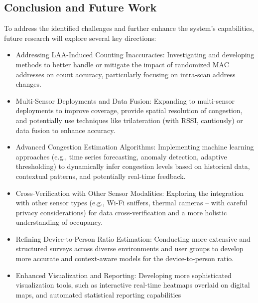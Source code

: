 \documentclass[runningheads]{llncs}
\begin{document}
\subsection{Conclusion and Future Work}
 To address the identified challenges and further enhance the system's capabilities, future research will explore several key directions:
\begin{itemize}
    \item    Addressing LAA-Induced Counting Inaccuracies: Investigating and developing methods to better handle or mitigate the impact of randomized MAC addresses on count accuracy, particularly focusing on intra-scan address changes.

   \item  Multi-Sensor Deployments and Data Fusion: Expanding to multi-sensor deployments to improve coverage, provide spatial resolution of congestion, and potentially use techniques like trilateration (with RSSI, cautiously) or data fusion to enhance accuracy.

    \item Advanced Congestion Estimation Algorithms: Implementing machine learning approaches (e.g., time series forecasting, anomaly detection, adaptive thresholding) to dynamically infer congestion levels based on historical data, contextual patterns, and potentially real-time feedback.

    \item Cross-Verification with Other Sensor Modalities: Exploring the integration with other sensor types (e.g., Wi-Fi sniffers, thermal cameras – with careful privacy considerations) for data cross-verification and a more holistic understanding of occupancy.

    \item Refining Device-to-Person Ratio Estimation: Conducting more extensive and structured surveys across diverse environments and user groups to develop more accurate and context-aware models for the device-to-person ratio.

    \item Enhanced Visualization and Reporting: Developing more sophisticated visualization tools, such as interactive real-time heatmaps overlaid on digital maps, and automated statistical reporting capabilities
\end{itemize}
\begin{credits}
\end{credits}
%
%
\end{document}
